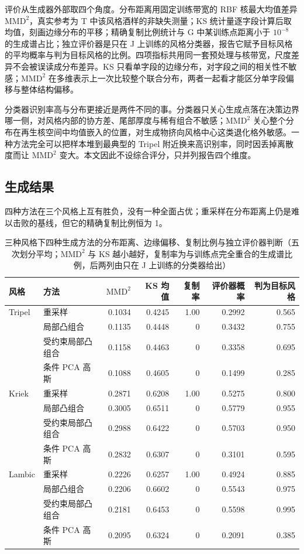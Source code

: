 评价从生成器外部取四个角度。分布距离用固定训练带宽的 RBF 核最大均值差异 $\mathrm{MMD}^2$\cite{gretton2012}，真实参考为 T 中该风格酒样的非缺失测量；KS 统计量逐字段计算后取均值，刻画边缘分布的平移；精确复制比例统计与 G 中某训练点距离小于 $10^{-8}$ 的生成谱占比；独立评价器是只在 J 上训练的风格分类器，报告它赋予目标风格的平均概率与判为目标风格的比例。四项指标共用同一套预处理与核带宽，尺度差异不会被误读成分布差异。KS 只看单字段的边缘分布，对字段之间的相关性不敏感；$\mathrm{MMD}^2$ 在多维表示上一次比较整个联合分布，两者一起看才能区分单字段偏移与整体结构偏移。

分类器识别率高与分布更接近是两件不同的事。分类器只关心生成点落在决策边界哪一侧，对风格内部的协方差、尾部厚度与稀有组合不敏感；$\mathrm{MMD}^2$ 关心整个分布在再生核空间中均值嵌入的位置，对生成物挤向风格中心这类退化格外敏感。一种方法完全可以把样本堆到最典型的 Tripel 附近换来高识别率，同时因丢掉离散度而让 $\mathrm{MMD}^2$ 变大。本文因此不设综合评分，只并列报告四个维度。

\subsection{生成结果}

四种方法在三个风格上互有胜负，没有一种全面占优；重采样在分布距离上仍是难以击败的基线，但它的精确复制比例恒为 1。

\begin{table}[t]
\centering
\caption{三种风格下四种生成方法的分布距离、边缘偏移、复制比例与独立评价器判断（五次划分平均；$\mathrm{MMD}^2$ 与 KS 越小越好，复制率为与训练点完全重合的生成谱比例，后两列由只在 J 上训练的分类器给出）}
\label{tab:gen}
\small
\begin{tabular}{llrrrrr}
\toprule
风格 & 方法 & $\mathrm{MMD}^2$ & KS 均值 & 复制率 & 评价器概率 & 判为目标风格 \\
\midrule
Tripel & 重采样 & 0.1034 & 0.4245 & 1.00 & 0.2992 & 0.565 \\
       & 局部凸组合 & 0.1135 & 0.4448 & 0 & 0.3432 & 0.755 \\
       & 受约束局部凸组合 & 0.1158 & 0.4463 & 0 & 0.3358 & 0.695 \\
       & 条件 PCA 高斯 & 0.1088 & 0.4605 & 0 & 0.1499 & 0.285 \\
\midrule
Kriek  & 重采样 & 0.2871 & 0.6208 & 1.00 & 0.5275 & 0.800 \\
       & 局部凸组合 & 0.3005 & 0.6511 & 0 & 0.5779 & 0.955 \\
       & 受约束局部凸组合 & 0.2988 & 0.6422 & 0 & 0.5703 & 0.950 \\
       & 条件 PCA 高斯 & 0.2832 & 0.6307 & 0 & 0.3101 & 0.595 \\
\midrule
Lambic & 重采样 & 0.2226 & 0.6257 & 1.00 & 0.4924 & 0.885 \\
       & 局部凸组合 & 0.2206 & 0.6602 & 0 & 0.5543 & 0.975 \\
       & 受约束局部凸组合 & 0.2181 & 0.6453 & 0 & 0.5598 & 0.995 \\
       & 条件 PCA 高斯 & 0.2095 & 0.6324 & 0 & 0.2091 & 0.385 \\
\bottomrule
\end{tabular}
\end{table}

